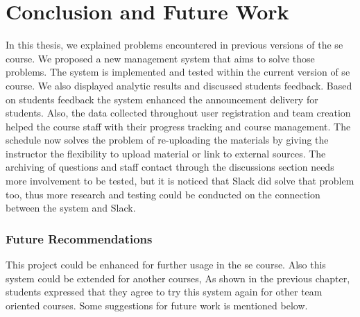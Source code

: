 \chapter{Conclusion and Future Work}
\label{chap:conclusion}
In this thesis, we explained problems encountered in previous versions of the \ac{se} course. We proposed a new management
system that aims to solve those problems. The system is implemented and tested within the current version of \ac{se} course. We
also displayed analytic results and discussed students feedback. Based on students feedback the system enhanced the announcement delivery for
students. Also, the data collected throughout user registration and team creation helped the course staff with their progress tracking and
course management. The schedule now solves the problem of re-uploading the materials by giving the instructor the flexibility to upload material or
link to external sources. The archiving of questions and staff contact through the discussions section needs more involvement to be tested,
but it is noticed that Slack\texttrademark{} did solve that problem too, thus more research and testing could be conducted
on the connection between the system and Slack\texttrademark{}.

\subsection{Future Recommendations}
\label{sub:future-work}
This project could be enhanced for further usage in the \ac{se} course. Also this system could be extended for another courses,
As shown in the previous chapter, students expressed that they agree to try this system again for other team oriented courses. Some
suggestions for future work is mentioned below.

